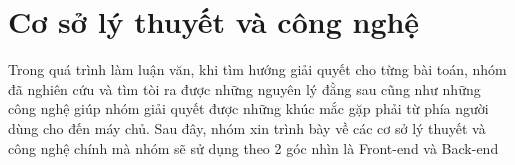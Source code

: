\chapter{Cơ sở lý thuyết và công nghệ}\label{chap:Tech}
		Trong quá trình làm luận văn, khi tìm hướng giải quyết cho từng bài toán, nhóm đã
		nghiên cứu và tìm tòi ra được những nguyên lý đằng sau cũng như những công nghệ giúp
		nhóm giải quyết được những khúc mắc gặp phải từ phía người dùng cho đến máy chủ. Sau đây, nhóm xin trình bày về các cơ sở lý thuyết và công nghệ chính mà nhóm sẽ sử dụng theo 2 góc nhìn là Front-end và Back-end
		
	
	
	